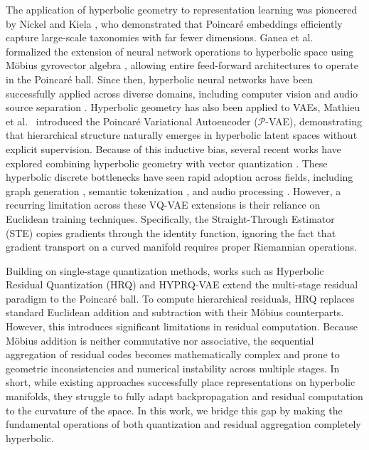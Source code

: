 \documentclass[12pt]{report}
\begin{document}
The application of hyperbolic geometry to representation learning was pioneered by Nickel and Kiela \cite{nickel2017poincare}, who demonstrated that Poincar\'e embeddings efficiently capture large-scale taxonomies with far fewer dimensions. Ganea et al.\ \cite{ganea2018hyperbolic} formalized the extension of neural network operations to hyperbolic space using M\"obius gyrovector algebra \cite{ungar2009gyrovector}, allowing entire feed-forward architectures to operate in the Poincar\'e ball. Since then, hyperbolic neural networks have been successfully applied across diverse domains, including computer vision \cite{khrulkov2020hyperbolic, atigh2022hyperbolic, mettes2024hyperbolic} and audio source separation \cite{petermann2023hyperbolic}. Hyperbolic geometry has also been applied to VAEs, Mathieu et al.\ \cite{mathieu2019poincare} introduced the Poincar\'e Variational Autoencoder ($\mathcal{P}$-VAE), demonstrating that hierarchical structure naturally emerges in hyperbolic latent spaces without explicit supervision. Because of this inductive bias, several recent works have explored combining hyperbolic geometry with vector quantization \cite{hypervq, hvqvae}. These hyperbolic discrete bottlenecks have seen rapid adoption across fields, including graph generation \cite{bu2025ggball}, semantic tokenization \cite{yao2026zeroshot, wang2026varlenrec}, and audio processing \cite{girish2026prosody}. However, a recurring limitation across these VQ-VAE extensions is their reliance on Euclidean training techniques. Specifically, the Straight-Through Estimator (STE) copies gradients through the identity function, ignoring the fact that gradient transport on a curved manifold requires proper Riemannian operations.

Building on single-stage quantization methods, works such as Hyperbolic Residual Quantization (HRQ) \cite{hrqvae} and HYPRQ-VAE \cite{hyprqvae_recsys} extend the multi-stage residual paradigm to the Poincar\'e ball. To compute hierarchical residuals, HRQ replaces standard Euclidean addition and subtraction with their M\"obius counterparts. However, this introduces significant limitations in residual computation. Because M\"obius addition is neither commutative nor associative, the sequential aggregation of residual codes becomes mathematically complex and prone to geometric inconsistencies and numerical instability across multiple stages. In short, while existing approaches successfully place representations on hyperbolic manifolds, they struggle to fully adapt backpropagation and residual computation to the curvature of the space. In this work, we bridge this gap by making the fundamental operations of both quantization and residual aggregation completely hyperbolic.
\end{document}
